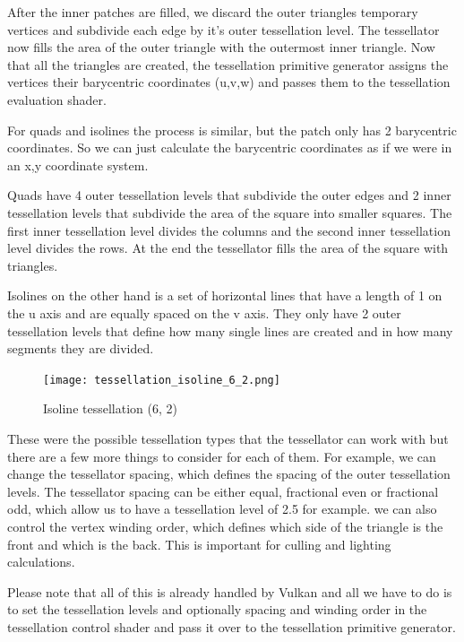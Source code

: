 \documentclass[12pt]{report} \usepackage{preamble}
\begin{document}
After the inner patches are filled, we discard the outer triangles temporary vertices
and subdivide each edge by it's outer tessellation level.
The tessellator now fills the area of the outer triangle with the outermost inner triangle.
Now that all the triangles are created, the tessellation primitive generator assigns
the vertices their barycentric coordinates (u,v,w)
and passes them to the tessellation evaluation shader. \cite{tessellation}

For quads and isolines the process is similar, but the patch only has 2 barycentric coordinates.
So we can just calculate the barycentric coordinates as if we were in
an x,y coordinate system. \cite{tessellation}

Quads have 4 outer tessellation levels that subdivide the outer edges
and 2 inner tessellation levels that subdivide the area of the square
into smaller squares. The first inner tessellation level divides the columns
and the second inner tessellation level divides the rows.
At the end the tessellator fills the area of the square with triangles. \cite{tessellation}

Isolines on the other hand is a set of horizontal lines that have a length
of 1 on the u axis and are equally spaced on the v axis.
They only have 2 outer tessellation levels that define how many single lines
are created and in how many segments they are divided.

\begin{figure}[hbtp]
	\centering \texttt{[image: tessellation\_isoline\_6\_2.png]}
	\caption{Isoline tessellation (6, 2)}
	\cite{fig:isoline}
\end{figure} \Floatbarrier

These were the possible tessellation types that the tessellator
can work with but there are a few more things to consider for each of them.
For example, we can change the tessellator spacing,
which defines the spacing of the outer tessellation levels.
The tessellator spacing can be either equal, fractional even or fractional odd,
which allow us to have a tessellation level of 2.5 for example. \cite{tessellation}
we can also control the vertex winding order, which defines which side of the triangle
is the front and which is the back. This is important
for culling and lighting calculations. \cite{tessellation}

Please note that all of this is already handled by Vulkan
and all we have to do is to set the tessellation levels and optionally spacing
and winding order in the tessellation control shader and pass it over
to the tessellation primitive generator. \cite{tessellation}
\end{document}
